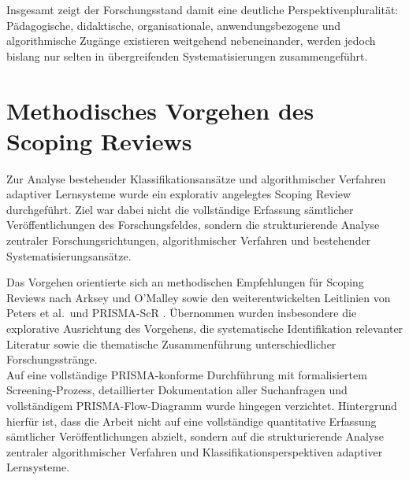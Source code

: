 Insgesamt zeigt der Forschungsstand damit eine deutliche
Perspektivenpluralität: Pädagogische, didaktische, organisationale,
anwendungsbezogene und algorithmische Zugänge existieren weitgehend
nebeneinander, werden jedoch bislang nur selten in übergreifenden
Systematisierungen zusammengeführt.

\section{Methodisches Vorgehen des Scoping
Reviews}\label{methodisches-vorgehen-des-scoping-reviews}

Zur Analyse bestehender Klassifikationsansätze und algorithmischer
Verfahren adaptiver Lernsysteme wurde ein explorativ angelegtes Scoping
Review durchgeführt. Ziel war dabei nicht die vollständige Erfassung
sämtlicher Veröffentlichungen des Forschungsfeldes, sondern die
strukturierende Analyse zentraler Forschungsrichtungen, algorithmischer
Verfahren und bestehender Systematisierungsansätze.

Das Vorgehen orientierte sich an methodischen Empfehlungen für Scoping
Reviews nach Arksey und O'Malley sowie den weiterentwickelten Leitlinien
von Peters et al.~und PRISMA-ScR
\citep{Arksey2005, Peters2020, Tricco2018}. Übernommen wurden
insbesondere die explorative Ausrichtung des Vorgehens, die
systematische Identifikation relevanter Literatur sowie die thematische
Zusammenführung unterschiedlicher Forschungsstränge.\\
Auf eine vollständige PRISMA-konforme Durchführung mit formalisiertem
Screening-Prozess, detaillierter Dokumentation aller Suchanfragen und
vollständigem PRISMA-Flow-Diagramm wurde hingegen verzichtet.
Hintergrund hierfür ist, dass die Arbeit nicht auf eine vollständige
quantitative Erfassung sämtlicher Veröffentlichungen abzielt, sondern
auf die strukturierende Analyse zentraler algorithmischer Verfahren und
Klassifikationsperspektiven adaptiver Lernsysteme.

